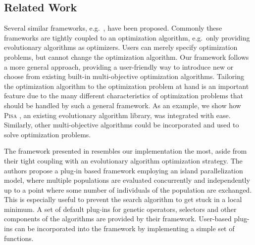 \documentclass[%
reprint,
amsmath,amssymb,
aps,
]{revtex4-1}
\begin{document}
\subsection{Related Work}

Several similar frameworks, e.g.~\cite{fide:09,lems:09,lbjt:07,dnld:06}, have
  been proposed.
Commonly these frameworks are tightly coupled to an optimization algorithm,
  e.g.\ only providing evolutionary algorithms as optimizers.
Users can merely specify optimization problems, but cannot change the
  optimization algorithm.
Our framework follows a more general approach, providing a user-friendly way
  to introduce new or choose from existing built-in multi-objective
  optimization algorithms.
Tailoring the optimization algorithm to the optimization problem at hand is
  an important feature due to the many different characteristics of
  optimization problems that should be handled by such a general framework.
As an example, we show how \textsc{Pisa} \cite{pisa}, an existing evolutionary
  algorithm library, was integrated with ease.
Similarly, other multi-objective algorithms could be incorporated and
  used to solve optimization problems.

The framework presented in \cite{lems:09} resembles our implementation the
  most, aside from their tight coupling with an evolutionary algorithm
  optimization strategy.
The authors propose a plug-in based framework employing an island
  parallelization model, where multiple populations are evaluated concurrently
  and independently up to a point where some number of individuals of the
  population are exchanged.
This is especially useful to prevent the search algorithm to get stuck in
  a local minimum.
A set of default plug-ins for genetic operators, selectors and other
  components of the algorithms are provided by their framework.
User-based plug-ins can be incorporated into the framework by implementing a
  simple set of functions.

\end{document}

